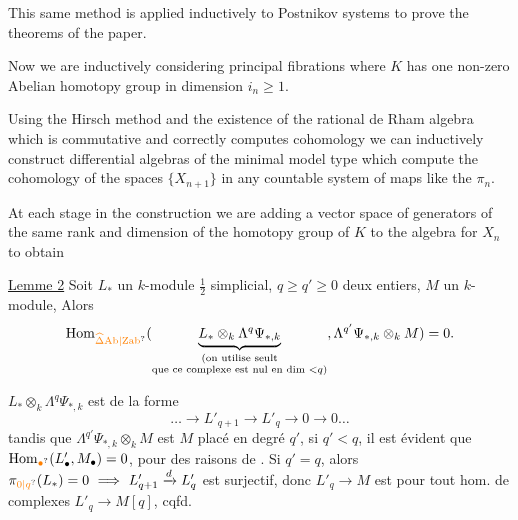 This same method is applied inductively to Postnikov systems to prove the theorems of the paper.

Now we are inductively considering principal fibrations
where $K$ has one non-zero Abelian homotopy group in dimension $i_n\geq1$.

Using the Hirsch method and the existence of the rational de Rham algebra which is commutative and correctly computes cohomology we can inductively construct differential algebras of the minimal model type which compute the cohomology of the spaces $\{X_{n+1}\}$ in any countable system of maps like the $\pi_n$.

At each stage in the construction we are adding a vector space of generators of the same rank and dimension of the homotopy group of $K$ to the algebra for $X_n$ to obtain

\uline{Lemme 2} Soit $L_*$ un $k$-module $\frac12$ simplicial,     $q\geq q'\geq0$ deux entiers, $M$ un $k$-module,  Alors
\[
\operatorname{Hom}_{\unsure{\widehat\Delta\mathrm{Ab}|\mathrm{Zab}}}
 (\underbrace{L_*\otimes_k\Lambda^q\Psi_{*,k}}_{\substack{\text{(on utilise seult}\\\text{que ce complexe est nul en dim }<q\text{)}}},\Lambda^{q'}\Psi_{*,k}\otimes_k M)=0.
\]


   $L_*\otimes_k\Lambda^q\Psi_{*,k}$ est   de la forme
\[
\ldots\longrightarrow L'_{q+1}\longrightarrow L'_q\longrightarrow0\longrightarrow0\ldots
\]
tandis que $\Lambda^{q'}\Psi_{*,k}\otimes_k M$ est $M$ placé en degré $q'$,  si $q'<q$, il est évident que $\operatorname{Hom}_{\unsure{\bullet}}(L'_{\bullet},M_{\bullet})=0$, pour des raisons de . Si $q'=q$,
alors $\pi_{\unsure{0|q}}(L_*)=0\ \Longrightarrow\ L'_{q+1}\xrightarrow{d}L'_q$ est surjectif, donc $L'_q\longrightarrow M$ est  pour tout hom. de complexes  $L'_{q}\longrightarrow M[q]$, cqfd.


